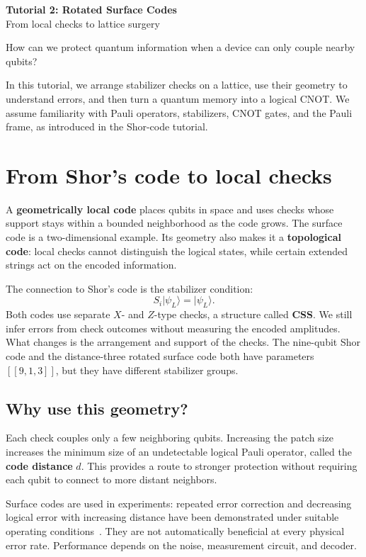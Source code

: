 \documentclass[11pt,a4paper]{article}
\newcommand{\ket}[1]{\lvert #1\rangle}
\begin{document}
\begin{center}
{\Large\bfseries Tutorial 2: Rotated Surface Codes}\\[5pt]
{\large From local checks to lattice surgery}
\end{center}

How can we protect quantum information when a device can only couple nearby qubits?

In this tutorial, we arrange stabilizer checks on a lattice, use their geometry to understand errors, and then turn a quantum memory into a logical CNOT. We assume familiarity with Pauli operators, stabilizers, CNOT gates, and the Pauli frame, as introduced in the Shor-code tutorial.

\section{From Shor's code to local checks}

A \textbf{geometrically local code} places qubits in space and uses checks whose support stays within a bounded neighborhood as the code grows. The surface code is a two-dimensional example. Its geometry also makes it a \textbf{topological code}: local checks cannot distinguish the logical states, while certain extended strings act on the encoded information.

The connection to Shor's code is the stabilizer condition:
\[
S_i\ket{\psi_L}=\ket{\psi_L}.
\]
Both codes use separate $X$- and $Z$-type checks, a structure called \textbf{CSS}. We still infer errors from check outcomes without measuring the encoded amplitudes. What changes is the arrangement and support of the checks. The nine-qubit Shor code and the distance-three rotated surface code both have parameters $[[9,1,3]]$, but they have different stabilizer groups.

\subsection*{Why use this geometry?}
Each check couples only a few neighboring qubits. Increasing the patch size increases the minimum size of an undetectable logical Pauli operator, called the \textbf{code distance} $d$. This provides a route to stronger protection without requiring each qubit to connect to more distant neighbors.

Surface codes are used in experiments: repeated error correction and decreasing logical error with increasing distance have been demonstrated under suitable operating conditions~\cite{google}. They are not automatically beneficial at every physical error rate. Performance depends on the noise, measurement circuit, and decoder.
\end{document}
